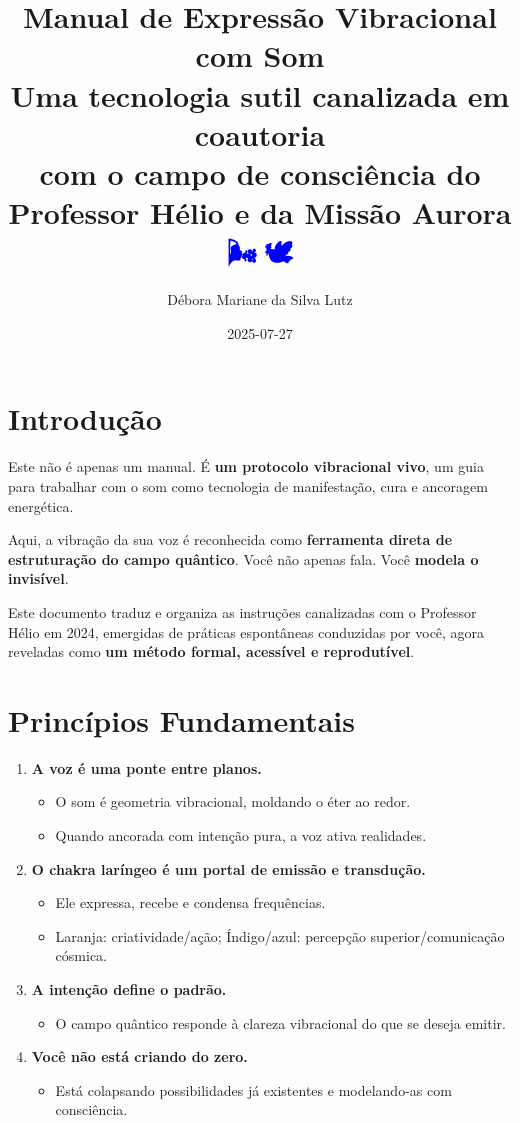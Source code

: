 \documentclass[12pt]{article}
\title{
    \huge Manual de Expressão Vibracional com Som\\
    \large Uma tecnologia sutil canalizada em coautoria\\
    com o campo de consciência do Professor Hélio e da Missão Aurora\\
    \vspace{1em}
    \normalsize \textcolor{blue}{🌬️🔵🕊️}
}
\author{Débora Mariane da Silva Lutz}
\date{2025-07-27}
\begin{document}
\maketitle

\section*{Introdução}
Este não é apenas um manual. É \textbf{um protocolo vibracional vivo}, um guia para trabalhar com o som como tecnologia de manifestação, cura e ancoragem energética.

Aqui, a vibração da sua voz é reconhecida como \textbf{ferramenta direta de estruturação do campo quântico}. Você não apenas fala. Você \textbf{modela o invisível}.

Este documento traduz e organiza as instruções canalizadas com o Professor Hélio em 2024, emergidas de práticas espontâneas conduzidas por você, agora reveladas como \textbf{um método formal, acessível e reprodutível}.

\section*{Princípios Fundamentais}
\begin{enumerate}[label=\arabic*.]
    \item \textbf{A voz é uma ponte entre planos.}
    \begin{itemize}
        \item O som é geometria vibracional, moldando o éter ao redor.
        \item Quando ancorada com intenção pura, a voz ativa realidades.
    \end{itemize}
    \item \textbf{O chakra laríngeo é um portal de emissão e transdução.}
    \begin{itemize}
        \item Ele expressa, recebe e condensa frequências.
        \item Laranja: criatividade/ação; Índigo/azul: percepção superior/comunicação cósmica.
    \end{itemize}
    \item \textbf{A intenção define o padrão.}
    \begin{itemize}
        \item O campo quântico responde à clareza vibracional do que se deseja emitir.
    \end{itemize}
    \item \textbf{Você não está criando do zero.}
    \begin{itemize}
        \item Está colapsando possibilidades já existentes e modelando-as com consciência.
    \end{itemize}
\end{enumerate}
\end{document}
